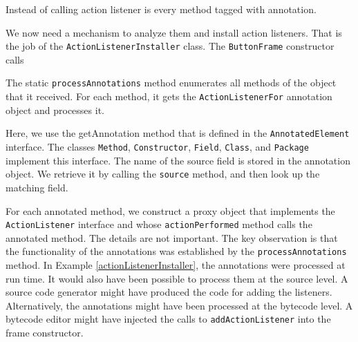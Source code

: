 \documentclass[11pt,twoside,a4paper]{book}
\begin{document}


Instead of calling action listener is every method tagged with annotation.





We now need a mechanism to analyze them and install action listeners. That is
the job of the \verb|ActionListenerInstaller| class. The \verb|ButtonFrame|
constructor calls



The static \verb|processAnnotations| method enumerates all methods of the object
that it received. For each method, it gets the \verb|ActionListenerFor|
annotation object and processes it.

Here, we use the getAnnotation method that is defined in the
\verb|AnnotatedElement| interface. The classes \verb|Method|,
\verb|Constructor|, \verb|Field|, \verb|Class|, and \verb|Package| implement
this interface. The name of the source field is stored in the annotation object.
We retrieve it by calling the \verb|source| method, and then look up the
matching field.



For each annotated method, we construct a proxy object that implements the\\
\verb|ActionListener| interface and whose \verb|actionPerformed| method calls
the annotated method. The details are not important. The key observation is that the functionality of the annotations was established
by the \verb|processAnnotations| method.
In Example \ref{actionListenerInstaller}, the annotations were processed at run
time. It would also have been possible to process them at the source level. A
source code generator might have produced the code for adding the listeners.
Alternatively, the annotations might have been processed at the bytecode level.
A bytecode editor might have injected the calls to \verb|addActionListener| into
the frame constructor.
\newpage

\end{document}
